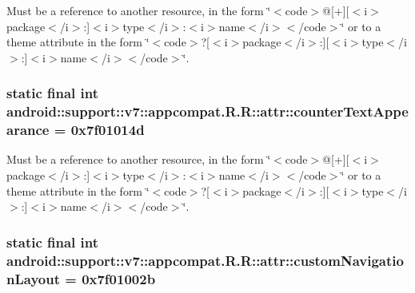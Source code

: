 Must be a reference to another resource, in the form \char`\"{}$<$code$>$@\mbox{[}+\mbox{]}\mbox{[}$<$i$>$package$<$/i$>$:\mbox{]}$<$i$>$type$<$/i$>$:$<$i$>$name$<$/i$>$$<$/code$>$\char`\"{} or to a theme attribute in the form \char`\"{}$<$code$>$?\mbox{[}$<$i$>$package$<$/i$>$:\mbox{]}\mbox{[}$<$i$>$type$<$/i$>$:\mbox{]}$<$i$>$name$<$/i$>$$<$/code$>$\char`\"{}. \hypertarget{classandroid_1_1support_1_1v7_1_1appcompat_1_1_r_1_1attr_42ac8746b85518b9fcdb38ef3c9d86c7}{
\subsubsection[{counterTextAppearance}]{\setlength{\rightskip}{0pt plus 5cm}static final int android::support::v7::appcompat.R.R::attr::counterTextAppearance = 0x7f01014d}}
\label{classandroid_1_1support_1_1v7_1_1appcompat_1_1_r_1_1attr_42ac8746b85518b9fcdb38ef3c9d86c7}


Must be a reference to another resource, in the form \char`\"{}$<$code$>$@\mbox{[}+\mbox{]}\mbox{[}$<$i$>$package$<$/i$>$:\mbox{]}$<$i$>$type$<$/i$>$:$<$i$>$name$<$/i$>$$<$/code$>$\char`\"{} or to a theme attribute in the form \char`\"{}$<$code$>$?\mbox{[}$<$i$>$package$<$/i$>$:\mbox{]}\mbox{[}$<$i$>$type$<$/i$>$:\mbox{]}$<$i$>$name$<$/i$>$$<$/code$>$\char`\"{}. \hypertarget{classandroid_1_1support_1_1v7_1_1appcompat_1_1_r_1_1attr_6b805028752180b18c6ab4b4f583c9ac}{
\subsubsection[{customNavigationLayout}]{\setlength{\rightskip}{0pt plus 5cm}static final int android::support::v7::appcompat.R.R::attr::customNavigationLayout = 0x7f01002b}}
\label{classandroid_1_1support_1_1v7_1_1appcompat_1_1_r_1_1attr_6b805028752180b18c6ab4b4f583c9ac}


